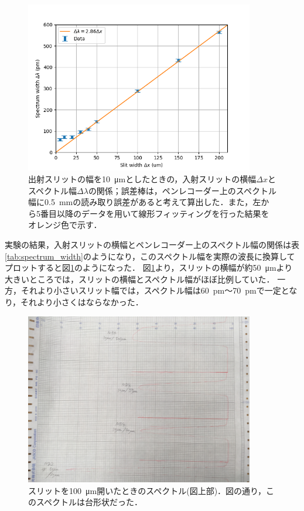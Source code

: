 \documentclass[titlepage]{jsarticle}
\begin{document}
\begin{figure}[htbp]
  \centering
  \includegraphics[width=10cm]{spectrum_width.png}
  \caption{出射スリットの幅を\SI{10}{\um}としたときの，入射スリットの横幅$\Delta x$とスペクトル幅$\Delta\lambda$の関係；誤差棒は，ペンレコーダー上のスペクトル幅に\SI{0.5}{\mm}の読み取り誤差があると考えて算出した．また，左から5番目以降のデータを用いて線形フィッティングを行った結果をオレンジ色で示す．}
  \label{fig:spectrum_width}
\end{figure}

実験の結果，入射スリットの横幅とペンレコーダー上のスペクトル幅の関係は表\ref{tab:spectrum_width}のようになり，このスペクトル幅を実際の波長に換算してプロットすると図\ref{fig:spectrum_width}のようになった．
図\ref{fig:spectrum_width}より，スリットの横幅が約\SI{50}{\um}より大きいところでは，スリットの横幅とスペクトル幅がほぼ比例していた．
一方，それより小さいスリット幅では，スペクトル幅は\SI{60}{\pm}～\SI{70}{\pm}で一定となり，それより小さくはならなかった．

\begin{figure}[htbp]
  \centering
  \includegraphics[width=10cm]{d3_delta30-100.JPG}
  \caption{スリットを\SI{100}{\um}開いたときのスペクトル(図上部)．図の通り，このスペクトルは台形状だった．}
  \label{fig:daikei}
\end{figure}
\end{document}
